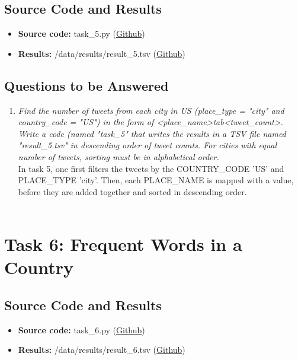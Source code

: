 \documentclass{article}
\begin{document}
\subsection*{Source Code and Results}
    \begin{itemize}
        \item \textbf{Source code:} task\_5.py (\href{https://github.com/FredrikBakken/TDT4305_Big-Data-Project/blob/master/PhaseOne/task_5.py}{Github})
        \item \textbf{Results:} /data/results/result\_5.tsv (\href{https://github.com/FredrikBakken/TDT4305_Big-Data-Project/blob/master/PhaseOne/data/results/result_5.tsv}{Github})
    \end{itemize}

\subsection*{Questions to be Answered}
\begin{enumerate}[label=\alph*)]
    \item \textit{Find the number of tweets from each city in US (place\_type = "city" and country\_code = "US") in the form of \textless place\_name\textgreater tab\textless tweet\_count\textgreater. Write a code (named "task\_5" that writes the results in a TSV file named "result\_5.tsv" in descending order of tweet counts. For cities with equal number of tweets, sorting must be in alphabetical order.}\\
    
    In task 5, one first filters the tweets by the COUNTRY\_CODE 'US' and PLACE\_TYPE 'city'. Then, each PLACE\_NAME is mapped with a value, before they are added together and sorted in descending order.\\ \\
\end{enumerate}


\section*{Task 6: Frequent Words in a Country}
\subsection*{Source Code and Results}
    \begin{itemize}
        \item \textbf{Source code:} task\_6.py (\href{https://github.com/FredrikBakken/TDT4305_Big-Data-Project/blob/master/PhaseOne/task_6.py}{Github})
        \item \textbf{Results:} /data/results/result\_6.tsv (\href{https://github.com/FredrikBakken/TDT4305_Big-Data-Project/blob/master/PhaseOne/data/results/result_6.tsv}{Github})
    \end{itemize}
\end{document}
